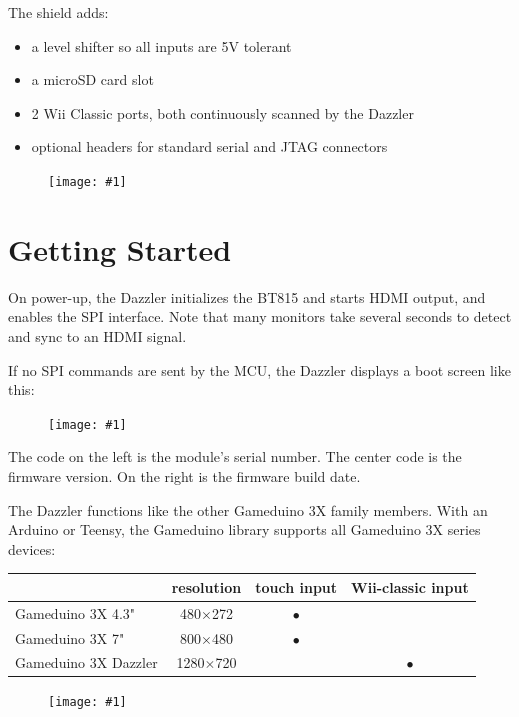 \documentclass{article}
\newcommand{\dev}{Dazzler}
\newcommand{\png}[1]{
\begin{figure}[H]
\begin{center}
\texttt{[image: \#1]}
\end{center}
\end{figure}
}
\newcommand{\pngw}[2]{
\begin{figure}[H]
\begin{center}
\texttt{[image: \#1]}
\end{center}
\end{figure}
}
\newcommand{\gap}{\vspace{10pt}}
\begin{document}
\noindent
The shield adds:
\begin{itemize}
\item a level shifter so all inputs are 5V tolerant 
\item a microSD card slot 
\item 2 Wii Classic ports, both continuously scanned by the Dazzler 
\item optional headers for standard serial and JTAG connectors 
\end{itemize}

\png{img/gameduino-3x-dazzler/rot-0182}

\newpage
\section{Getting Started}

On power-up, the \dev{}
initializes the BT815 and starts HDMI output, 
and enables the SPI interface. 
Note that many monitors take several seconds to detect and sync to an HDMI signal.

If no SPI commands are sent by the MCU,
the \dev{}
displays a boot screen like this:

\pngw{img/gameduino-3x-dazzler/boot}{1.0}

The code on the left is the module's serial number. 
The center code is the firmware version. 
On the right is the firmware build date.

The Dazzler functions like the other Gameduino 3X family members.
With an Arduino or Teensy, the Gameduino library supports all Gameduino 3X series devices:

\gap
\begin{tabular}{lccc}

       & resolution & touch input & Wii-classic input \\
\hline

Gameduino 3X 4.3"    & 480$\times$272 & $\bullet$ & \\
Gameduino 3X 7"      & 800$\times$480 & $\bullet$ & \\
Gameduino 3X Dazzler & 1280$\times$720 & & $\bullet$ \\
\hline

\end{tabular}
\gap

\pngw{img/gameduino-3x-dazzler/helloworld}{1.0}
\end{document}
